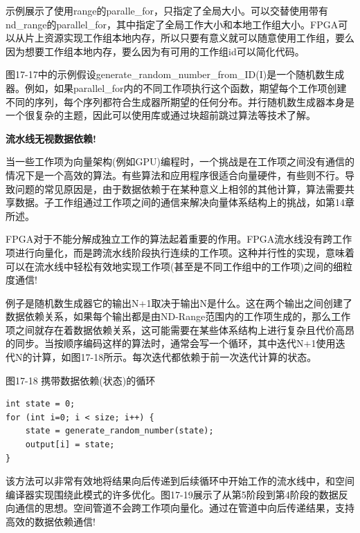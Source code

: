 示例展示了使用range的paralle\_for，只指定了全局大小。可以交替使用带有nd\_range的parallel\_for，其中指定了全局工作大小和本地工作组大小。FPGA可以从片上资源实现工作组本地内存，所以只要有意义就可以随意使用工作组，要么因为想要工作组本地内存，要么因为有可用的工作组id可以简化代码。\par

\begin{tcolorbox}[colback=blue!5!white,colframe=blue!75!black, title=并行随机数生成器]
图17-17中的示例假设generate\_random\_number\_from\_ID(I)是一个随机数生成器。例如，如果parallel\_for内的不同工作项执行这个函数，期望每个工作项创建不同的序列，每个序列都符合生成器所期望的任何分布。并行随机数生成器本身是一个很复杂的主题，因此可以使用库或通过块超前跳过算法等技术了解。
\end{tcolorbox}

\hspace*{\fill} \par %
\textbf{流水线无视数据依赖!}

当一些工作项为向量架构(例如GPU)编程时，一个挑战是在工作项之间没有通信的情况下是一个高效的算法。有些算法和应用程序很适合向量硬件，有些则不行。导致问题的常见原因是，由于数据依赖于在某种意义上相邻的其他计算，算法需要共享数据。子工作组通过工作项之间的通信来解决向量体系结构上的挑战，如第14章所述。\par

FPGA对于不能分解成独立工作的算法起着重要的作用。FPGA流水线没有跨工作项进行向量化，而是跨流水线阶段执行连续的工作项。这种并行性的实现，意味着可以在流水线中轻松有效地实现工作项(甚至是不同工作组中的工作项)之间的细粒度通信!\par

例子是随机数生成器它的输出N+1取决于输出N是什么。这在两个输出之间创建了数据依赖关系，如果每个输出都是由ND-Range范围内的工作项生成的，那么工作项之间就存在着数据依赖关系，这可能需要在某些体系结构上进行复杂且代价高昂的同步。当按顺序编码这样的算法时，通常会写一个循环，其中迭代N+1使用迭代N的计算，如图17-18所示。每次迭代都依赖于前一次迭代计算的状态。\par

\hspace*{\fill} \par %
图17-18 携带数据依赖(状态)的循环
\begin{lstlisting}[caption={}]
int state = 0;
for (int i=0; i < size; i++) {
	state = generate_random_number(state);
	output[i] = state;
}
\end{lstlisting}

该方法可以非常有效地将结果向后传递到后续循环中开始工作的流水线中，和空间编译器实现围绕此模式的许多优化。图17-19展示了从第5阶段到第4阶段的数据反向通信的思想。空间管道不会跨工作项向量化。通过在管道中向后传递结果，支持高效的数据依赖通信!\par

